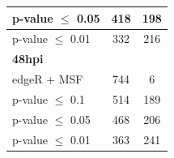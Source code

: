 \documentclass[10pt,a4paper,twocolumn]{article}
\begin{document}
\begin{table}[]
\begin{tabular}{lll}
			\multicolumn{1}{|l|}{p-value $\leq$ 0.05} & \multicolumn{1}{c|}{418}                                             & \multicolumn{1}{c|}{198}              \\ \hline
			\multicolumn{1}{|l|}{p-value $\leq$ 0.01} & \multicolumn{1}{c|}{332}                                             & \multicolumn{1}{c|}{216}              \\ \hline
			\multicolumn{1}{|l|}{\textbf{48hpi}}              & \multicolumn{1}{c|}{}                                                & \multicolumn{1}{c|}{}                 \\ \hline
			\multicolumn{1}{|l|}{edgeR + MSF}                 & \multicolumn{1}{c|}{744}                                             & \multicolumn{1}{c|}{6}                \\ \hline
			\multicolumn{1}{|l|}{p-value $\leq$ 0.1}  & \multicolumn{1}{c|}{514}                                             & \multicolumn{1}{c|}{189}               \\ \hline
			\multicolumn{1}{|l|}{p-value $\leq$ 0.05} & \multicolumn{1}{c|}{468}                                             & \multicolumn{1}{c|}{206}               \\ \hline
			\multicolumn{1}{|l|}{p-value $\leq$ 0.01} & \multicolumn{1}{c|}{363}                                             & \multicolumn{1}{c|}{241}               \\ \hline
		\end{tabular}
	\end{table}
	
	
	
	
\end{document}
